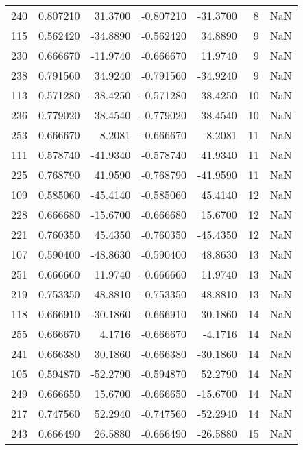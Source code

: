 \begin{tabular}{rrrrrrr}
240 &    0.807210 &   31.3700 &   -0.807210 &    -31.3700 &           8 & NaN \\
115 &    0.562420 &  -34.8890 &   -0.562420 &     34.8890 &           9 & NaN \\
230 &    0.666670 &  -11.9740 &   -0.666670 &     11.9740 &           9 & NaN \\
238 &    0.791560 &   34.9240 &   -0.791560 &    -34.9240 &           9 & NaN \\
113 &    0.571280 &  -38.4250 &   -0.571280 &     38.4250 &          10 & NaN \\
236 &    0.779020 &   38.4540 &   -0.779020 &    -38.4540 &          10 & NaN \\
253 &    0.666670 &    8.2081 &   -0.666670 &     -8.2081 &          11 & NaN \\
111 &    0.578740 &  -41.9340 &   -0.578740 &     41.9340 &          11 & NaN \\
225 &    0.768790 &   41.9590 &   -0.768790 &    -41.9590 &          11 & NaN \\
109 &    0.585060 &  -45.4140 &   -0.585060 &     45.4140 &          12 & NaN \\
228 &    0.666680 &  -15.6700 &   -0.666680 &     15.6700 &          12 & NaN \\
221 &    0.760350 &   45.4350 &   -0.760350 &    -45.4350 &          12 & NaN \\
107 &    0.590400 &  -48.8630 &   -0.590400 &     48.8630 &          13 & NaN \\
251 &    0.666660 &   11.9740 &   -0.666660 &    -11.9740 &          13 & NaN \\
219 &    0.753350 &   48.8810 &   -0.753350 &    -48.8810 &          13 & NaN \\
118 &    0.666910 &  -30.1860 &   -0.666910 &     30.1860 &          14 & NaN \\
255 &    0.666670 &    4.1716 &   -0.666670 &     -4.1716 &          14 & NaN \\
241 &    0.666380 &   30.1860 &   -0.666380 &    -30.1860 &          14 & NaN \\
105 &    0.594870 &  -52.2790 &   -0.594870 &     52.2790 &          14 & NaN \\
249 &    0.666650 &   15.6700 &   -0.666650 &    -15.6700 &          14 & NaN \\
217 &    0.747560 &   52.2940 &   -0.747560 &    -52.2940 &          14 & NaN \\
243 &    0.666490 &   26.5880 &   -0.666490 &    -26.5880 &          15 & NaN \\

\end{tabular}
